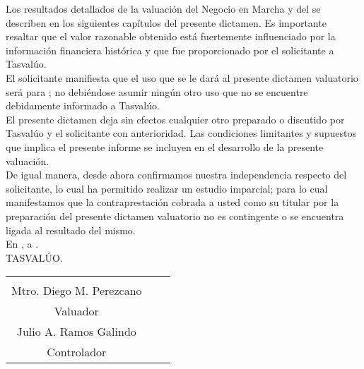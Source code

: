 Los resultados detallados de la valuación del Negocio en Marcha y del \tipoAvaluo{} se describen en los siguientes capítulos del presente dictamen. Es importante resaltar que el valor razonable obtenido está fuertemente influenciado por la información financiera histórica y que fue proporcionado por el solicitante a \textcolor{principal}{Tasvalúo}.\\ 

El solicitante manifiesta que el uso que se le dará al presente dictamen valuatorio será para \textcolor{principal}{\textit{\usoAvaluo}}; no debiéndose asumir ningún otro uso que no se encuentre debidamente informado a \textcolor{principal}{Tasvalúo}.\\

El presente dictamen deja sin efectos cualquier otro preparado o discutido por \textcolor{principal}{Tasvalúo} y el solicitante con anterioridad. Las condiciones limitantes y supuestos que implica el presente informe se incluyen en el desarrollo de la presente valuación.\\

De igual manera, desde ahora confirmamos nuestra independencia respecto del solicitante, lo cual ha permitido realizar un estudio imparcial; para lo cual manifestamos que la contraprestación cobrada a usted como su titular por la preparación del presente dictamen valuatorio no es contingente o se encuentra ligada al resultado del mismo.\\


\textcolor{principal}{En \lugarInforme, a \fechaInforme.}\\

\textcolor{principal}{TASVALÚO.}\\

\begin{table}[H]
\centering
	\begin{tabular}{cm{1cm}c}
	\begin{minipage}{7cm}
	\begin{center}
		
		
		\rule{7cm}{.4pt}\\
		Mtro. Diego M. Perezcano\\
		Valuador
		
	\end{center}
	\end{minipage}&&
	\begin{minipage}{7cm}
	\begin{center}
		
		\rule{7cm}{.4pt}\\
		Julio A. Ramos Galindo\\
		Controlador
		
	\end{center}
	\end{minipage}
	
	\end{tabular}
\end{table}


